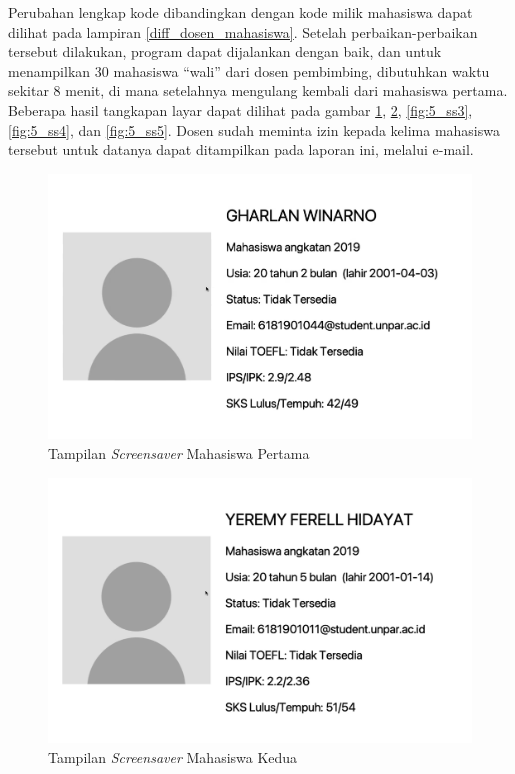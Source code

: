 Perubahan lengkap kode dibandingkan dengan kode milik mahasiswa dapat dilihat pada lampiran \ref{diff_dosen_mahasiswa}.
Setelah perbaikan-perbaikan tersebut dilakukan, program dapat dijalankan dengan baik, dan untuk menampilkan 30 mahasiswa ``wali'' dari dosen pembimbing, dibutuhkan waktu sekitar 8 menit, di mana setelahnya mengulang kembali dari mahasiswa pertama. Beberapa hasil tangkapan layar dapat dilihat pada gambar \ref{fig:5_ss1}, \ref{fig:5_ss2}, \ref{fig:5_ss3}, \ref{fig:5_ss4}, dan \ref{fig:5_ss5}. Dosen sudah meminta izin kepada kelima mahasiswa tersebut untuk datanya dapat ditampilkan pada laporan ini, melalui e-mail.

\begin{figure}[H]
	\centering
	\includegraphics[scale=0.25]{Gambar/ss1.png}
	\caption{Tampilan \textit{Screensaver} Mahasiswa Pertama}
	\label{fig:5_ss1}
\end{figure}

\begin{figure}[H]
	\centering
	\includegraphics[scale=0.3]{Gambar/ss2.png}
	\caption{Tampilan \textit{Screensaver} Mahasiswa Kedua}
	\label{fig:5_ss2}
\end{figure}

